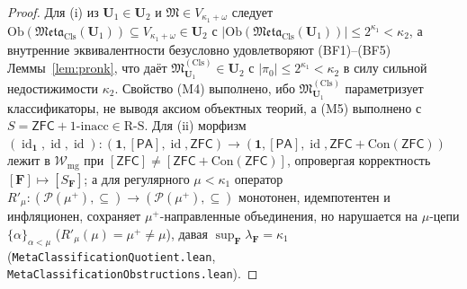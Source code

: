 \documentclass[11pt]{article}
\theoremstyle{plain}
\theoremstyle{definition}
\newcommand{\RS}{\mathrm{R\text{-}S}}
\newcommand{\fM}{\mathfrak{M}}
\newcommand{\Meta}{\mathfrak{Meta}}
\newcommand{\Ob}{\mathrm{Ob}}
\newcommand{\Con}{\mathrm{Con}}
\newcommand{\PA}{\mathsf{PA}}
\newcommand{\ZFC}{\mathsf{ZFC}}
\DeclareMathOperator{\id}{id}
\begin{document}
\begin{proof}
Для (i) из $\mathbf{U}_1 \in \mathbf{U}_2$ и $\fM \in V_{\kappa_1+\omega}$ следует $\Ob(\Meta_{\mathrm{Cls}}(\mathbf{U}_1)) \subseteq V_{\kappa_1+\omega} \in \mathbf{U}_2$ с $|\Ob(\Meta_{\mathrm{Cls}}(\mathbf{U}_1))| \le 2^{\kappa_1} < \kappa_2$, а внутренние эквивалентности безусловно удовлетворяют (BF1)--(BF5) Леммы~\ref{lem:pronk}, что даёт $\fM^{(\mathrm{Cls})}_{\mathbf{U}_1} \in \mathbf{U}_2$ с $|\pi_0| \le 2^{\kappa_1} < \kappa_2$ в силу сильной недостижимости $\kappa_2$. Свойство (M4) выполнено, ибо $\fM^{(\mathrm{Cls})}_{\mathbf{U}_1}$ параметризует классификаторы, не выводя аксиом объектных теорий, а (M5) выполнено с $S = \ZFC + 1\text{-inacc} \in \RS$. Для (ii) морфизм $(\id_{\mathbf{1}}, \id, \id) : (\mathbf{1}, [\PA], \id, \ZFC) \to (\mathbf{1}, [\PA], \id, \ZFC+\Con(\ZFC))$ лежит в $\mathcal{W}_{\mathrm{mg}}$ при $[\ZFC] \neq [\ZFC+\Con(\ZFC)]$, опровергая корректность $[\mathbf{F}] \mapsto [S_{\mathbf{F}}]$; а для регулярного $\mu < \kappa_1$ оператор $R'_\mu : (\mathcal{P}(\mu^+), \subseteq) \to (\mathcal{P}(\mu^+), \subseteq)$ монотонен, идемпотентен и инфляционен, сохраняет $\mu^+$-направленные объединения, но нарушается на $\mu$-цепи $\{\alpha\}_{\alpha < \mu}$ ($R'_\mu(\mu) = \mu^+ \neq \mu$), давая $\sup_{\mathbf{F}} \lambda_{\mathbf{F}} = \kappa_1$ (\texttt{MetaClassificationQuotient.lean}, \texttt{MetaClassificationObstructions.lean}).
\end{proof}
\end{document}
